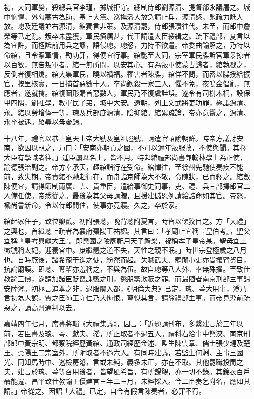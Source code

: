 \begin{pinyinscope}
初，大同軍變，殺總兵官李瑾，據城拒守。總制侍郎劉源清、提督郤永議屠之。城中恟懼，外勾蒙古為助，塞上大震。巡撫潘人放急請止兵，源清怒，馳疏力詆人放。璁及廷議並右源清，綰獨言非策。及源清罷，侍郎張瓚往代。未至，而郎中詹榮等已定亂。叛卒未盡獲，軍民瘡痍甚，代王請遣大臣綏緝之。疏下禮部，夏言以為宜許，而極詆前用兵之謬，語侵璁。璁怒，力持不欲遣。帝委曲諭解之，乃特以命綰，且令察軍情，勘功罪，得便宜行事。綰馳至大同，宗室軍民牒訴官軍暴掠者以百數，無告叛軍者。綰一無所問，以安其心。有為叛軍使蒙古歸者，綰執戮之，反側者復相煽。綰大集軍民，曉以禍福。罹害者陳牒，綰佯不問，而密以牒授給振官，按里核實，一日捕首惡數十人。卒尚欽殺一家三人，懼不免，夜鳴金倡亂，無應者，遂就擒。綰復圖形購首惡數人，軍民乃不復虞詿誤。遂令有司樹木柵，設保甲四隅，創社學，教軍民子弟，城中大安。還朝，列上文武將吏功罪，極詆源清、永。綰以勞增俸一等，璁及兵部庇源清，陰抑綰。綰累疏論，帝亦意嚮之，源清、永卒被逮。綰尋以母憂歸。

十八年，禮官以恭上皇天上帝大號及皇祖謚號，請遣官詔諭朝鮮。時帝方議討安南，欲因以覘之，乃曰：「安南亦朝貢之國，不可以邇年叛服故，不使與聞。其擇大臣有學識者往。」廷臣屢以名上，皆不用。特起綰禮部尚書兼翰林學士為正使，諭德張治副之。帝方幸承天，趣綰詣行在受命。綰憚往，至徐州先馳使奏疾不能前，致失期。帝責綰不馳赴行在，而舟詣京師為大不敬，令陳狀，已而釋之。綰數陳便宜，請得節制兩廣、雲、貴重臣，遣給事御史同事，吏、禮、兵三部擇郎官二人備任使。帝悉從之。最後為其父母請贈，且援建儲恩例請給誥命如其官。帝怒，褫尚書新命，令以侍郎閒住，使事亦竟寢。久之，卒於家。

綰起家任子，致位卿貳。初附張璁，晚背璁附夏言，時皆以傾狡目之。方「大禮」之興也，首繼璁上疏者為襄府棗陽王祐楒。其言曰：「孝廟止宜稱『皇伯考』，聖父宜稱『皇考興獻大王』。即興國之陵廟祀用天子禮樂，祝稱孝子皇帝某。聖母宜上徽號稱太妃，迎養宮中。庶繼體之道不失，天性之親不泯。」時世宗登極歲之八月也。自時厥後，諸希寵干進之徒，紛然而起。失職武夫、罷閒小吏亦皆攘臂努目，抗論廟謨。即璁、萼輩亦羞稱之，不與為伍。故自璁等八人外，率無殊擢。至致仕教諭王價，遂請加諸臣貶竄誅戮之刑，懲朋黨欺蔽之罪。而最陋者南京刑部主事歸安陸澄。初極言追尊之非，逮服闋入都，《明倫大典》已定，璁、萼大用事，澄乃言初為人誤，質之臣師王守仁乃大悔恨。萼悅其言，請除禮部主事。而帝見澄前疏惡之，謫高州通判以去。

嘉靖四年七月，席書將輯《大禮集議》，因言：「近題請刊布，多繫建言於三年以前，若臣書及璁、萼、獻夫、韜，所正取者不過五人。禮科右給事中熊浹、南京刑部郎中黃宗明、都察院經歷黃綰、通政司經歷金述、監生陳雲章、儒士張少璉及楚王、棗陽王二宗室外，所附取者不過六人。有同時建議，若監生何淵、主事王國光、同知馬時中、巡檢房濬，言或未純，義多未正，亦在不取。其他罷職投閒之夫，建言於璁、萼等召用後者，皆望風希旨，有所覬覦，亦一切不錄。其錦衣百戶聶能遷、昌平致仕教諭王價建言三年二三月，未經採入。今二臣奏乞附名，應如其請。」帝從之。因詔「大禮」已定，自今有假言陳奏者，必罪不宥。


\end{pinyinscope}
